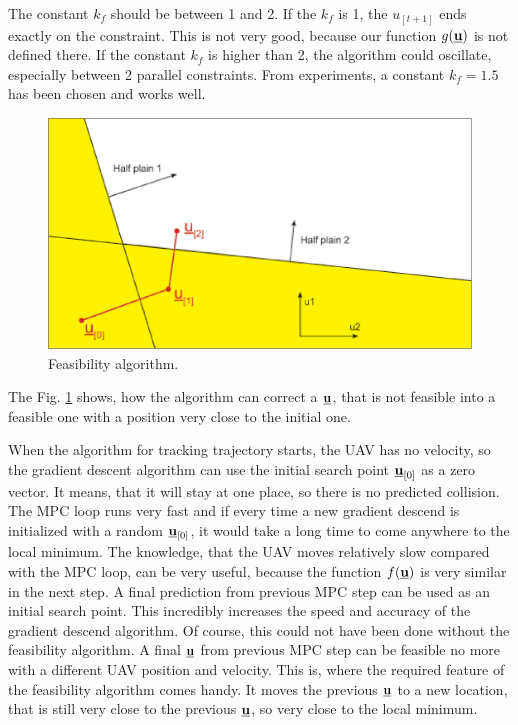 \documentclass[a4paper,11pt,titlepage]{article}
\newcommand{\uvec}{\textbf{\underline{u}}}
\newcommand{\macf}{f(\uvec)}
\newcommand{\macg}{g(\uvec)}
\begin{document}
The constant $k_f$ should be between 1 and 2. If the $k_f$ is 1, the $u_{[t+1]}$ ends exactly on the constraint. This is not very good, because our function $\macg$ is not defined there. If the constant $k_f$ is higher than 2, the algorithm could oscillate, especially between 2 parallel constraints. From experiments, a constant $k_f = 1.5$ has been chosen and works well.

\begin{figure}[ht]
\includegraphics[width=1\textwidth]{fig/feasibility_paint.eps}
\caption{Feasibility algorithm.}
\label{fig:feasibility_algorithm}
\end{figure}


The Fig. \ref{fig:feasibility_algorithm} shows, how the algorithm can correct a $\uvec$, that is not feasible into a feasible one with a position very close to the initial one. 

When the algorithm for tracking trajectory starts, the UAV has no velocity, so the gradient descent algorithm can use the initial search point $\uvec_{[0]}$ as a zero vector. It means, that it will stay at one place, so there is no predicted collision. The MPC loop runs very fast and if every time a new gradient descend is initialized with a random $\uvec_{[0]}$, it would take a long time to come anywhere to the local minimum. The knowledge, that the UAV moves relatively slow compared with the MPC loop, can be very useful, because the function $\macf$ is very similar in the next step. A final prediction from previous MPC step can be used as an initial search point. This incredibly increases the speed and accuracy of the gradient descend algorithm. Of course, this could not have been done without the feasibility algorithm. A final $\uvec$ from previous MPC step can be feasible no more with a different UAV position and velocity. This is, where the required feature of the feasibility algorithm comes handy. It moves the previous $\uvec$ to a new location, that is still very close to the previous $\uvec$, so very close to the local minimum. 
\end{document}
